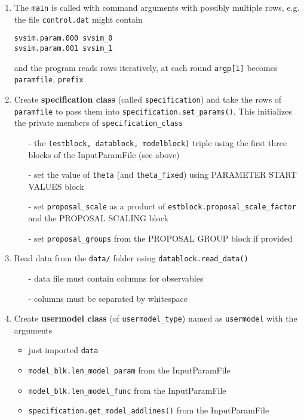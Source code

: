 \documentclass[11pt, letterpaper, notitlepage]{article}
\begin{document}
\begin{enumerate}
\item The \texttt{main} is called with command arguments with possibly multiple rows, e.g. the file \texttt{control.dat} might contain 
\begin{verbatim}
svsim.param.000 svsim_0
svsim.param.001 svsim_1 
\end{verbatim} 
and the program reads rows iteratively, at each round \texttt{argp[1]} becomes \texttt{paramfile}, \texttt{prefix}

\item Create \textbf{specification class} (called \texttt{specification}) and take the rows of \texttt{paramfile} to pass them into \texttt{specification.set\_params()}. This initializes the private members of \texttt{specification\_class}
\begin{itemize}
\item[-] the \texttt{(estblock, datablock, modelblock)} triple using the first three blocks of the InputParamFile (see above)
\item[-] set the value of \texttt{theta} (and \texttt{theta\_fixed}) using PARAMETER START VALUES block
\item[-] set \texttt{proposal\_scale} as a product of \texttt{estblock.proposal\_scale\_factor} and the PROPOSAL SCALING block
\item[-] set \texttt{proposal\_groups} from the PROPOSAL GROUP block if provided
\end{itemize} 
\item Read data from the \texttt{data/} folder using \texttt{datablock.read\_data()}
\begin{itemize}
\item[-] data file must contain columns for observables
\item[-] columns must be separated by whitespace
\end{itemize}
\item Create \textbf{usermodel class} (of \texttt{usermodel\_type}) named as \texttt{usermodel} with the arguments
\begin{itemize}
\item just imported \texttt{data}
\item \texttt{model\_blk.len\_model\_param} from the InputParamFile
\item \texttt{model\_blk.len\_model\_func} from the InputParamFile
\item \texttt{specification.get\_model\_addlines()} from the InputParamFile 
\end{itemize}
 

\end{enumerate}
\end{document}
